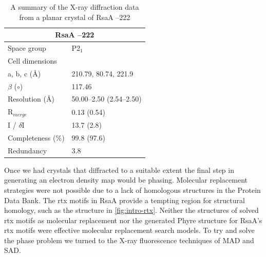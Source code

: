         \begin{table}[p]
            \caption[Summary data from the X-ray diffraction of RsaA --222]{ A summary of the X-ray diffraction data from a planar crystal of RsaA --222  }
            \begin{center}
                \begin{tabular}{@{}ll@{}}
                    \toprule
										\multicolumn{2}{c}{RsaA \del 0--222}			 \\ \midrule
										Space group				& P2$_{1}$							 \\
										Cell dimensions		&												 \\
										a, b, c (\AA)				& 210.79, 80.74, 221.9	 \\
										$\beta$ ($\circ$)							& 117.46								 \\
										Resolution (\AA)		& 50.00--2.50 (2.54--2.50) \\
										R$_{merge}$				& 0.13 (0.54)						 \\
										I / $\delta$I						 & 13.7 (2.8)							\\
										Completeness (\%) & 99.8 (97.6)						\\
										Redundancy				& 3.8										 \\ \bottomrule
               \end{tabular}
            \end{center}
            \label{tab:diffractiondata}
        \end{table}   
 
 Once we had crystals that diffracted to a suitable extent the final step in generating an electron density map would be phasing. Molecular replacement strategies were not possible due to a lack of homologous structures in the Protein Data Bank. The \ac{rtx}  motifs in RsaA provide a tempting region for structural homology, such as the structure in \cref{fig:intro-rtx}. Neither the structures of solved \ac{rtx} motifs as molecular replacement  nor the generated Phyre structure for RsaA's \ac{rtx} motifs were effective molecular replacement search models. To try and solve the phase problem we turned to the X-ray fluorescence techniques of \ac{MAD} and \ac{SAD}. 

